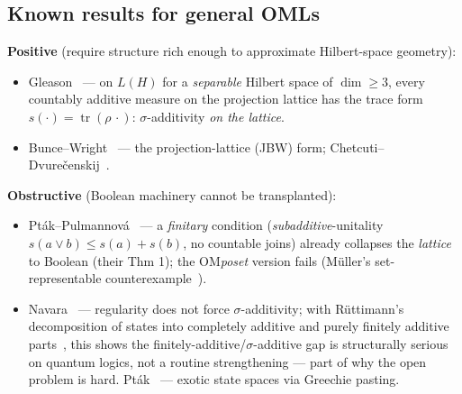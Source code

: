 \documentclass[11pt,reqno]{amsart}
\theoremstyle{plain}
\theoremstyle{definition}
\theoremstyle{remark}
\newcommand{\tr}{\operatorname{tr}}
\begin{document}
\subsection{Known results for general OMLs}
\textbf{Positive} (require structure rich enough to approximate Hilbert-space
geometry):
\begin{itemize}[noitemsep, topsep=2pt]
  \item Gleason~\cite{Gleason1957} --- on $L(H)$ for a \emph{separable} Hilbert space
    of $\dim\geq3$, every countably additive measure on the projection lattice has the
    trace form $s(\cdot)=\tr(\rho\,\cdot)$: $\sigma$-additivity \emph{on the lattice}.
  \item Bunce--Wright~\cite{BunceWright1992} --- the projection-lattice (JBW) form;
    Chetcuti--Dvure\v{c}enskij~\cite{ChetcutiDvurecenskij2005}.
\end{itemize}
\textbf{Obstructive} (Boolean machinery cannot be transplanted):
\begin{itemize}[noitemsep, topsep=2pt]
  \item Pt\'{a}k--Pulmannov\'{a}~\cite{PtakPulmannova1994} --- a
    \emph{finitary} condition (\emph{subadditive}-unitality
    $s(a\vee b)\le s(a)+s(b)$, no countable joins) already collapses the
    \emph{lattice} to Boolean (their Thm 1); the OM\emph{poset} version fails
    (M\"uller's set-representable counterexample~\cite{Muller1993}).
  \item Navara~\cite{Navara1992} --- regularity does not force
    $\sigma$-additivity; with R\"{u}ttimann's decomposition of states into
    completely additive and purely finitely additive parts~\cite{Ruttimann1994},
    this shows the finitely-additive/$\sigma$-additive gap is structurally
    serious on quantum logics, not a routine strengthening --- part of why the
    open problem is hard. \quad Pt\'{a}k~\cite{Ptak1987} --- exotic state
    spaces via Greechie pasting.
\end{itemize}
\end{document}
